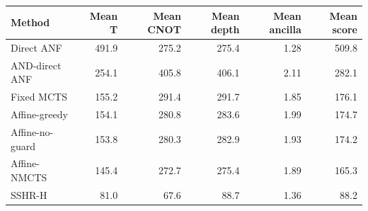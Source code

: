 \begin{tabular}{lrrrrr}
\toprule
Method & Mean T & Mean CNOT & Mean depth & Mean ancilla & Mean score \\
\midrule
Direct ANF & 491.9 & 275.2 & 275.4 & 1.28 & 509.8 \\
AND-direct ANF & 254.1 & 405.8 & 406.1 & 2.11 & 282.1 \\
Fixed MCTS & 155.2 & 291.4 & 291.7 & 1.85 & 176.1 \\
Affine-greedy & 154.1 & 280.8 & 283.6 & 1.99 & 174.7 \\
Affine-no-guard & 153.8 & 280.3 & 282.9 & 1.93 & 174.2 \\
Affine-NMCTS & 145.4 & 272.7 & 275.4 & 1.89 & 165.3 \\
SSHR-H & 81.0 & 67.6 & 88.7 & 1.36 & 88.2 \\
\bottomrule
\end{tabular}
